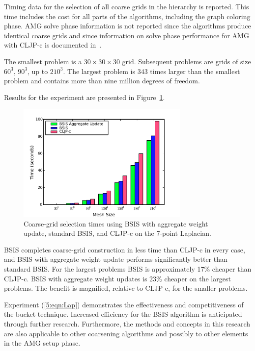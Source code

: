 \documentclass{elsart}
\begin{document}
Timing data for the selection of all coarse grids in the hierarchy is
reported. This time includes the cost for all parts of the algorithms,
including the graph coloring phase. AMG solve phase information is not
reported since the algorithms produce identical coarse grids and since
information on solve phase performance for AMG with CLJP-c is
documented in~\cite{alber-cljpc, alber-PCGS}.

The smallest problem is a $30 \times 30 \times 30$ grid. Subsequent
problems are grids of size $60^3$, $90^3$, up to $210^3$. The largest
problem is 343 times larger than the smallest problem and contains
more than nine million degrees of freedom.

Results for the experiment are presented in
Figure~\ref{5:fig:results-full}.
\begin{figure}
  \begin{center}
    \includegraphics[width=0.75\textwidth]{images/agg-no-scaling}
    \caption{Coarse-grid selection times using BSIS with aggregate
    weight update, standard BSIS, and CLJP-c on the 7-point
    Laplacian.}
    \label{5:fig:results-full}
  \end{center}
\end{figure}
BSIS completes coarse-grid construction in less time than CLJP-c in
every case, and BSIS with aggregate weight update performs
significantly better than standard BSIS. For the largest problems BSIS
is approximately 17\% cheaper than CLJP-c. BSIS with aggregate weight
updates is 23\% cheaper on the largest problems. The benefit is
magnified, relative to CLJP-c, for the smaller problems.

Experiment (\ref{5:eqn:Lap}) demonstrates the effectiveness and
competitiveness of the bucket technique. Increased efficiency for the
BSIS algorithm is anticipated through further research. Furthermore,
the methods and concepts in this research are also applicable to other
coarsening algorithms and possibly to other elements in the AMG setup
phase.
\end{document}
